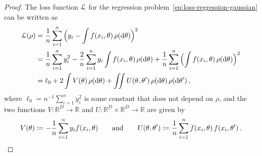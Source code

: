 \documentclass{custom}
\begin{document}
\begin{proof}
The loss function $\EuScript{L}$ for the regression problem~\eqref{eq:loss-regression-gaussian} can be written as
\begin{align*}
\EuScript{L}(\rho)
& =\frac{1}{n}\sum_{i=1}^{n}{\Bigl(y_i - \int f(x_{i},\theta)\,\rho(\mathrm d \theta)\Bigr)^{2}} \\
&=\frac{1}{n}\sum_{i=1}^{n}y_{i}^{2}-\frac{2}{n}\sum_{i=1}^{n}y_{i}\int f(x_{i},\theta)\,\rho(\mathrm d\theta)+\frac{1}{n}\sum_{i=1}^{n} {\Bigl(\int f(x_{i},\theta)\,\rho(\mathrm d\theta)\Bigr)^{2}}\\
 & =\ell_{0}+2\int V(\theta)\,\rho(\mathrm d \theta)+\iint U(\theta,\theta')\,\rho(\mathrm d\theta)\,\rho(\mathrm d\theta')\,,
\end{align*}
where $\ell_{0}=n^{-1}\sum_{i=1}^{n}y_{i}^{2}$ is some constant that
does not depend on $\rho$, and the two functions $V:\mathbb{R}^{D}\to\mathbb{R}$
and $U:\mathbb{R}^{D}\times\mathbb{R}^{D}\to\mathbb{R}$ are given
by
\begin{align}\label{eq:defUV}
    V(\theta)\coloneqq-\frac{1}{n}\sum_{i=1}^{n}y_{i}f(x_{i},\theta)\qquad\text{and}\qquad U(\theta,\theta')\coloneqq \frac{1}{n}\sum_{i=1}^{n}f(x_{i},\theta)\,f(x_{i},\theta')\,.
\end{align}


\end{proof}
\end{document}
